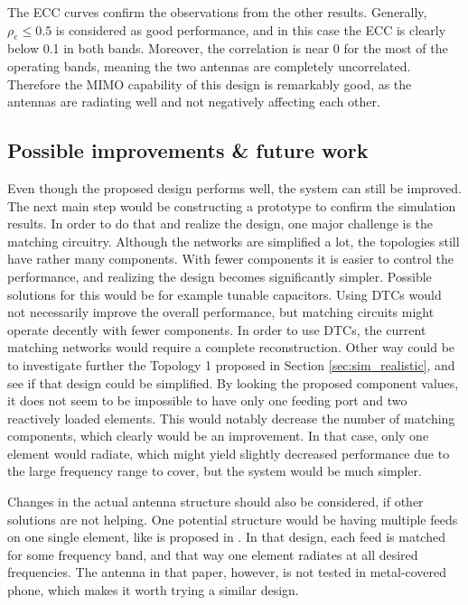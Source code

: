 The ECC curves confirm the observations from the other results. Generally, $\rho_e\leq0.5$ is considered as good performance, and in this case the ECC is clearly below 0.1 in both bands. Moreover, the correlation is near 0 for the most of the operating bands, meaning the two antennas are completely uncorrelated. Therefore the MIMO capability of this design is remarkably good, as the antennas are radiating well and not negatively affecting each other.

\subsection{Possible improvements \& future work}
\label{sec:improvements}
Even though the proposed design performs well, the system can still be improved. The next main step would be constructing a prototype to confirm the simulation results. In order to do that and realize the design, one major challenge is the matching circuitry. Although the networks are simplified a lot, the topologies still have rather many components. With fewer components it is easier to control the performance, and realizing the design becomes significantly simpler. Possible solutions for this would be for example tunable capacitors. Using DTCs would not necessarily improve the overall performance, but matching circuits might operate decently with fewer components. In order to use DTCs, the current matching networks would require a complete reconstruction. Other way could be to investigate further the Topology 1 proposed in Section \ref{sec:sim_realistic}, and see if that design could be simplified. By looking the proposed component values, it does not seem to be impossible to have only one feeding port and two reactively loaded elements. This would notably decrease the number of matching components, which clearly would be an improvement. In that case, only one element would radiate, which might yield slightly decreased performance due to the large frequency range to cover, but the system would be much simpler.

Changes in the actual antenna structure should also be considered, if other solutions are not helping. One potential structure would be having multiple feeds on one single element, like is proposed in \cite{valkonen_multifeed}. In that design, each feed is matched for some frequency band, and that way one element radiates at all desired frequencies. The antenna in that paper, however, is not tested in metal-covered phone, which makes it worth trying a similar design.

